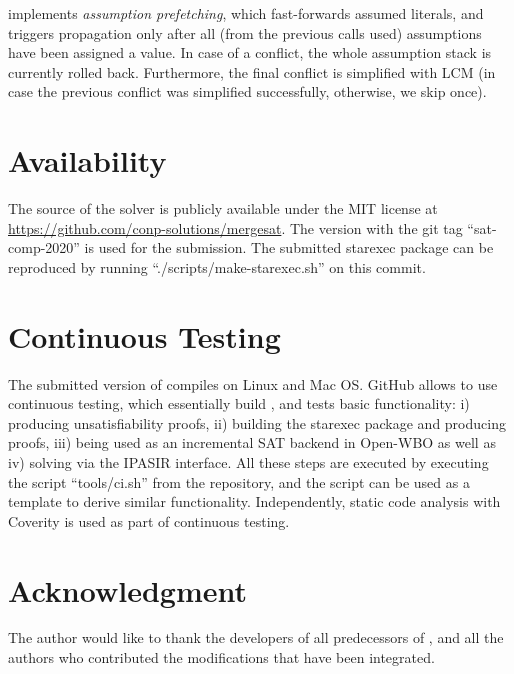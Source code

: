 \documentclass[conference]{IEEEtran}
\begin{document}
\mergesat implements \emph{assumption prefetching}, which fast-forwards assumed literals, and triggers propagation only after all (from the previous calls used) assumptions have been assigned a value.
In case of a conflict, the whole assumption stack is currently rolled back.
Furthermore, the final conflict is simplified with LCM (in case the previous conflict was simplified successfully, otherwise, we skip once).

\section{Availability}

The source of the solver is publicly available under the MIT license at \url{https://github.com/conp-solutions/mergesat}.
The version with the git tag ``sat-comp-2020'' is used for the submission.
The submitted starexec package can be reproduced by running ``./scripts/make-starexec.sh'' on this commit.

\section{Continuous Testing}

The submitted version of \mergesat compiles on Linux and Mac OS.
GitHub allows to use continuous testing, which essentially build \mergesat, and tests basic functionality:
i) producing unsatisfiability proofs, ii) building the starexec package and producing proofs, iii) being used as an incremental SAT backend in Open-WBO as well as  iv) solving via the IPASIR interface.
All these steps are executed by executing the script ``tools/ci.sh'' from the repository, and the script can be used as a template to derive similar functionality.
Independently, static code analysis with Coverity is used as part of continuous testing.

\section*{Acknowledgment}

The author would like to thank the developers of all predecessors of \mergesat, and all the authors who contributed the modifications that have been integrated.

\newpage



\end{document}
